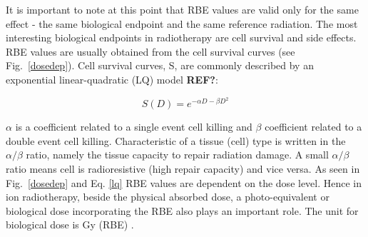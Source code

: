 \documentclass[type=dr, dr=rernat, accentcolor=tud7b,colorbacktitle, bigchapter, openright, twoside, 12pt ]{tudthesis}
\begin{document}
It is important to note at this point that RBE values are valid only for the same effect - the same biological endpoint and the same reference radiation. The most interesting biological endpoints in radiotherapy are cell survival and
side effects. RBE values are usually obtained from the cell survival curves (see Fig.~\ref{dosedep}). Cell survival curves, S, are commonly described by an exponential linear-quadratic (LQ) model \textbf{REF?}:

\begin{equation}
 S(D) = e^{-\alpha D - \beta D^2}
 \label{lq}
\end{equation}

$\alpha$ is a coefficient related to a single event cell killing and $\beta$ coefficient related to a double event cell killing. Characteristic of a tissue (cell) type is written in the $\alpha / \beta$ ratio, namely the tissue 
capacity to repair radiation damage. A small $\alpha / \beta$ ratio means cell is radioresistive (high repair capacity) and vice versa.
As seen in Fig.~\ref{dosedep} and Eq. \ref{lq} RBE values are dependent on the dose level. Hence in ion radiotherapy, beside the physical absorbed dose, a photo-equivalent or biological dose incorporating the RBE also plays an important role. 
The unit for biological dose is Gy (RBE) \cite{ICRU2007}. 
\end{document}
